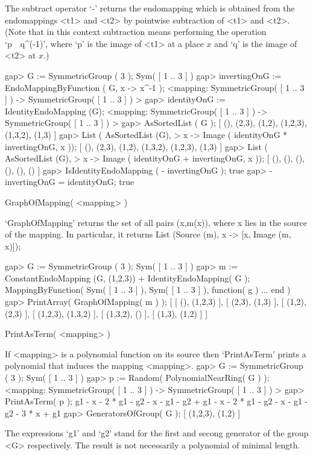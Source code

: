 The subtract operator `-' returns the endomapping which is 
obtained from the endomappings <t1> and <t2> by pointwise 
subtraction of <t1> and <t2>. (Note that in this context subtraction 
means performing the {\GAP} operation `p\ \*\ q\^{}(-1)',
where
`p' is the image of <t1> at a place $x$ and `q' is the image of <t2> at $x$.) 

\beginexample
    gap> G := SymmetricGroup ( 3 );
    Sym( [ 1 .. 3 ] )
    gap> invertingOnG := EndoMappingByFunction ( G, x -> x^-1 );
    <mapping: SymmetricGroup( [ 1 .. 3 ] ) -> SymmetricGroup(
    [ 1 .. 3 ] ) >
    gap> identityOnG := IdentityEndoMapping (G);
    <mapping: SymmetricGroup( [ 1 .. 3 ] ) -> SymmetricGroup(
    [ 1 .. 3 ] ) >
    gap> AsSortedList ( G );
    [ (), (2,3), (1,2), (1,2,3), (1,3,2), (1,3) ]
    gap> List ( AsSortedList (G), 
    >              x -> Image ( identityOnG * invertingOnG, x ));
    [ (), (2,3), (1,2), (1,3,2), (1,2,3), (1,3) ]
    gap> List ( AsSortedList (G),
    >              x -> Image ( identityOnG + invertingOnG, x ));
    [ (), (), (), (), (), () ]
    gap> IsIdentityEndoMapping ( - invertingOnG );
    true
    gap> - invertingOnG = identityOnG;
    true
\endexample



\> GraphOfMapping( <mapping> )

`GraphOfMapping' returns the set of all pairs (x,m(x)), where
x lies in the source of the mapping. In particular, it returns
List (Source (m), x -> [x, Image (m, x)]);

\beginexample
    gap> G := SymmetricGroup ( 3 );
    Sym( [ 1 .. 3 ] )
    gap> m := ConstantEndoMapping (G, (1,2,3)) + IdentityEndoMapping( G );
    MappingByFunction( Sym( [ 1 .. 3 ] ), Sym( [ 1 .. 3 ] ), function( g ) ... end )
    gap> PrintArray( GraphOfMapping( m ) );
    [ [       (),  (1,2,3) ],
      [    (2,3),    (1,3) ],
      [    (1,2),    (2,3) ],
      [  (1,2,3),  (1,3,2) ],
      [  (1,3,2),       () ],
      [    (1,3),    (1,2) ] ]
\endexample

\> PrintAsTerm( <mapping> )

If <mapping> is a polynomial function on its source then `PrintAsTerm'
prints a polynomial that induces the mapping <mapping>.
\beginexample
    gap> G := SymmetricGroup ( 3 );
    Sym( [ 1 .. 3 ] )
    gap> p := Random( PolynomialNearRing( G ) );
    <mapping: SymmetricGroup( [ 1 .. 3 ] ) -> SymmetricGroup( [ 1 .. 3 ] ) >
    gap> PrintAsTerm( p );
    g1 - x - 2 * g1 - g2 - x - g1 - g2 + g1 - x - 2 * g1 - 
    g2 - x - g1 - g2 - 3 * x + g1
    gap> GeneratorsOfGroup( G );
    [ (1,2,3), (1,2) ]
\endexample

The expressions `g1' and `g2' stand for the first and secong generator 
of the group <G> respectively. The result is not necessarily a 
polynomial of minimal length.

